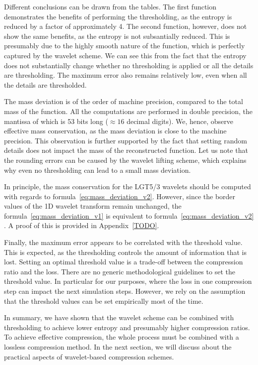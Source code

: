 Different conclusions can be drawn from the tables.
The first function demonstrates the benefits of performing the thresholding, as the entropy is reduced by a factor of approximately 4.
The second function, however, does not show the same benefits, as the entropy is not subsantially reduced.
This is presumably due to the highly smooth nature of the function, which is perfectly captured by the wavelet scheme.
We can see this from the fact that the entropy does not substantially change whether no thresholding is applied or all the details are thresholding.
The maximum error also remains relatively low, even when all the details are thresholded.

The mass deviation is of the order of machine precision, compared to the total mass of the function.
All the computations are performed in double precision, the mantissa of which is 53 bits long ($\approx 16$ decimal digits).
We, hence, observe effective mass conservation, as the mass deviation is close to the machine precision.
This observation is further supported by the fact that setting random details does not impact the mass of the reconstructed function.
Let us note that the rounding errors can be caused by the wavelet lifting scheme, which explains why even no thresholding can lead to a small mass deviation.

In principle, the mass conservation for the LGT5/3 wavelets should be computed with regards to formula~\ref{eq:mass_deviation_v2}.
However, since the border values of the 1D wavelet transform remain unchanged, the formula~\ref{eq:mass_deviation_v1} is equivalent to formula~\ref{eq:mass_deviation_v2} .
A proof of this is provided in Appendix~\ref{TODO}. %

Finally, the maximum error appears to be correlated with the threshold value.
This is expected, as the thresholding controls the amount of information that is lost.
Setting an optimal threshold value is a trade-off between the compression ratio and the loss.
There are no generic methodological guidelines to set the threshold value.
In particular for our purposes, where the loss in one compression step can impact the next simulation steps.
However, we rely on the assumption that the threshold values can be set empirically most of the time.

In summary, we have shown that the wavelet scheme can be combined with thresholding to achieve lower entropy and presumably higher compression ratios.
To achieve effective compression, the whole process must be combined with a lossless compression method.
In the next section, we will discuss about the practical aspects of wavelet-based compression schemes.

